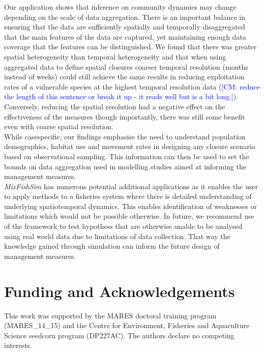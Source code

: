 \documentclass[review]{elsarticle}
\begin{document}
Our application shows that inference on community dynamics may change depending
on the scale of data aggregation. There is an important balance in ensuring
that the data are sufficiently spatially and temporally disaggregated that the
main features of the data are captured, yet maintaining enough data coverage
that the features can be distinguished. We found that there
was greater spatial heterogeneity than temporal heterogeneity and that when
using aggregated data to define spatial closures coarser temporal resolution
(months instead of weeks) could still achieve the same results in reducing
exploitation rates of a vulnerable species at the highest temporal resolution
data (\textcolor{blue}{[CM: reduce the length of this sentence or break it up - it reads well but is a bit long.]}). Conversely, reducing the spatial resolution had a negative effect on the
effectiveness of the measures \deleted{(}though\added{,} importantly, there was still some benefit
even with coarse spatial resolution\deleted{)}. \\

While  case\added{-}specific, our findings emphasise the
need to understand population demographics, habitat use and movement rates in
designing any closure scenario based on observational sampling. This
information can then be used to set the bounds on data aggregation used in
modelling studies aimed at informing the management measures. \\ 

\textit{MixFishSim} has numerous potential additional applications as it
enables the user to apply methods to a fisheries system where there is detailed
understanding of underlying spatiotemporal dynamics. This enables
identification of weaknesses or limitations which would not be possible
otherwise. In future, we recommend use of the framework to test
hypothess that are otherwise unable to be analysed using real
world data due to limitations of data collection. That way the knowledge gained
through simulation can inform the future design of management measures. 

\section*{Funding and Acknowledgements} This work was supported by the MARES
doctoral training program (MARES\_14\_15) and the Centre for Environment,
Fisheries and Aquaculture Science seedcorn program (DP227AC). The authors declare no competing
interests.
\end{document}
